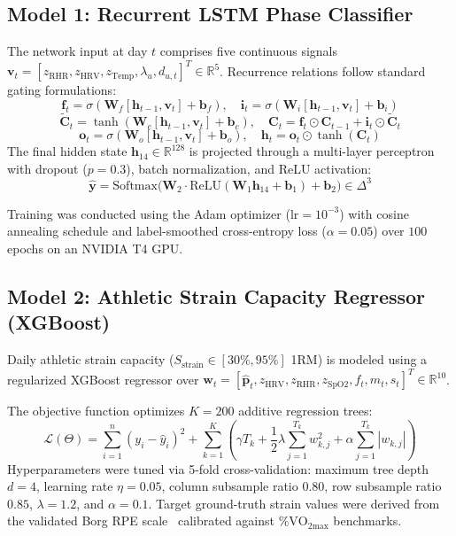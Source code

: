 \documentclass[conference]{IEEEtran}
\begin{document}
\subsection{Model 1: Recurrent LSTM Phase Classifier}
The network input at day $t$ comprises five continuous signals $\mathbf{v}_t = [z_{\text{RHR}}, z_{\text{HRV}}, z_{\text{Temp}}, \lambda_u, d_{u,t}]^T \in \mathbb{R}^5$. Recurrence relations follow standard gating formulations:
\begin{equation}
\mathbf{f}_t = \sigma(\mathbf{W}_f [\mathbf{h}_{t-1}, \mathbf{v}_t] + \mathbf{b}_f), \quad \mathbf{i}_t = \sigma(\mathbf{W}_i [\mathbf{h}_{t-1}, \mathbf{v}_t] + \mathbf{b}_i)
\end{equation}
\begin{equation}
\tilde{\mathbf{C}}_t = \tanh(\mathbf{W}_c [\mathbf{h}_{t-1}, \mathbf{v}_t] + \mathbf{b}_c), \quad \mathbf{C}_t = \mathbf{f}_t \odot \mathbf{C}_{t-1} + \mathbf{i}_t \odot \tilde{\mathbf{C}}_t
\end{equation}
\begin{equation}
\mathbf{o}_t = \sigma(\mathbf{W}_o [\mathbf{h}_{t-1}, \mathbf{v}_t] + \mathbf{b}_o), \quad \mathbf{h}_t = \mathbf{o}_t \odot \tanh(\mathbf{C}_t)
\end{equation}
The final hidden state $\mathbf{h}_{14} \in \mathbb{R}^{128}$ is projected through a multi-layer perceptron with dropout ($p=0.3$), batch normalization, and ReLU activation:
\begin{equation}
\hat{\mathbf{y}} = \text{Softmax}\big(\mathbf{W}_2 \cdot \text{ReLU}(\mathbf{W}_1 \mathbf{h}_{14} + \mathbf{b}_1) + \mathbf{b}_2\big) \in \Delta^3
\end{equation}

Training was conducted using the Adam optimizer ($\text{lr} = 10^{-3}$) with cosine annealing schedule and label-smoothed cross-entropy loss ($\alpha = 0.05$) over $100$ epochs on an NVIDIA T4 GPU.

\subsection{Model 2: Athletic Strain Capacity Regressor (XGBoost)}
Daily athletic strain capacity ($S_{\text{strain}} \in [30\%, 95\%]$ 1RM) is modeled using a regularized XGBoost regressor over $\mathbf{w}_t = [\hat{\mathbf{p}}_t, z_{\text{HRV}}, z_{\text{RHR}}, z_{\text{SpO2}}, f_t, m_t, s_t]^T \in \mathbb{R}^{10}$.

The objective function optimizes $K = 200$ additive regression trees:
\begin{equation}
\mathcal{L}(\Theta) = \sum_{i=1}^n (y_i - \hat{y}_i)^2 + \sum_{k=1}^K \left( \gamma T_k + \frac{1}{2}\lambda \sum_{j=1}^{T_k} w_{k,j}^2 + \alpha \sum_{j=1}^{T_k} |w_{k,j}| \right)
\end{equation}
Hyperparameters were tuned via 5-fold cross-validation: maximum tree depth $d = 4$, learning rate $\eta = 0.05$, column subsample ratio $0.80$, row subsample ratio $0.85$, $\lambda = 1.2$, and $\alpha = 0.1$. Target ground-truth strain values were derived from the validated Borg RPE scale~\cite{borg1982} calibrated against $\% \text{VO}_{2\text{max}}$ benchmarks.
\end{document}

